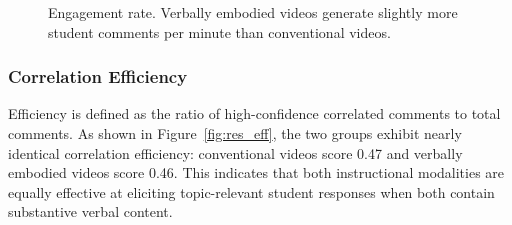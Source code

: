 \begin{figure}[h!]
    \centering
    \caption{Engagement rate. Verbally embodied videos generate slightly more student comments per minute than conventional videos.}
    \label{fig:res_eng}
\end{figure}

\subsubsection{Correlation Efficiency}
Efficiency is defined as the ratio of high-confidence correlated comments to total comments. As shown in Figure~\ref{fig:res_eff}, the two groups exhibit nearly identical correlation efficiency: conventional videos score 0.47 and verbally embodied videos score 0.46. This indicates that both instructional modalities are equally effective at eliciting topic-relevant student responses when both contain substantive verbal content.

